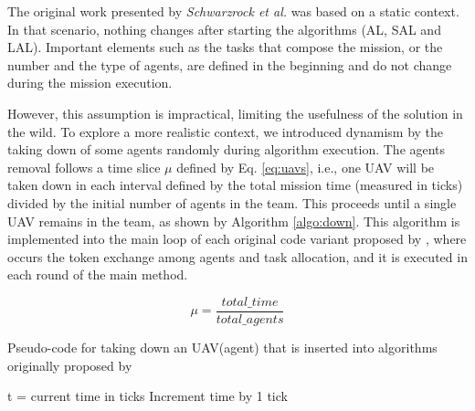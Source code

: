 
The original work presented by \textit{Schwarzrock et al.}\cite{MAS07} was based on a static context. In that scenario, nothing changes after starting the algorithms (AL, SAL and LAL). Important elements such as the tasks that compose the mission, or the number and the type of agents, are defined in the beginning and do not change during the mission execution.

However, this assumption is impractical, limiting the usefulness of the solution in the wild. To explore a more realistic context, we introduced dynamism by the taking down of some agents randomly during algorithm execution. 
The agents removal follows a time slice $\mu$ defined by Eq. \ref{eq:uavs}, i.e., one UAV will be taken down in each interval defined by the total mission time (measured in ticks) divided by the initial number of agents in the team. This proceeds until a single UAV remains in the team, as shown by Algorithm \ref{algo:down}. This algorithm is implemented into the main loop of each original code variant proposed by \cite{MAS07}, where occurs the token exchange among agents and task allocation, and it is executed in each round of the main method.

\begin{equation} \label{eq:uavs}
	\mu = \frac{total\_time}{total\_agents}
\end{equation}

\begin{algorithm}[!ht]
	\caption{Pseudo-code for taking down an UAV(agent) that is inserted into algorithms originally proposed by \cite{MAS07}}
	\label{algo:down}
	
	\SetAlgoLined
	\DontPrintSemicolon
	\SetNlSkip{0.3em}
	
	t = current time in ticks \;
	Increment time by 1 tick \;
\end{algorithm}

